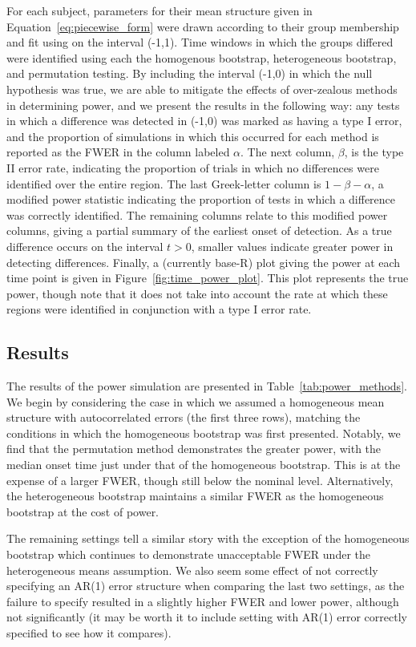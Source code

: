 For each subject, parameters for their mean structure given in Equation~\ref{eq:piecewise_form} were drawn according to their group membership and fit using  on the interval (-1,1). Time windows in which the groups differed were identified using each the homogenous bootstrap, heterogeneous bootstrap, and permutation testing. By including the interval (-1,0) in which the null hypothesis was true, we are able to mitigate the effects of over-zealous methods in determining power, and we present the results in the following way: any tests in which a difference was detected in (-1,0) was marked as having a type I error, and the proportion of simulations in which this occurred for each method is reported as the FWER in the column labeled $\alpha$. The next column, $\beta$, is the type II error rate, indicating the proportion of trials in which no differences were identified over the entire region. The last Greek-letter column is $1 - \beta - \alpha$, a modified power statistic indicating the proportion of tests in which a difference was correctly identified. The remaining columns relate to this modified power columns, giving a partial summary of the earliest onset of detection. As a true difference occurs on the interval $t > 0$, smaller values indicate greater power in detecting differences. Finally, a (currently base-R) plot giving the power at each time point is given in Figure~\ref{fig:time_power_plot}. This plot represents the true power, though note that it does not take into account the rate at which these regions were identified in conjunction with a type I error rate.



\subsection{Results}

The results of the power simulation are presented in Table~\ref{tab:power_methods}. We begin by considering the case in which we assumed a homogeneous mean structure with autocorrelated errors (the first three rows), matching the conditions in which the homogeneous bootstrap was first presented. Notably, we find that the permutation method demonstrates the greater power, with the median onset time just under that of the homogeneous bootstrap. This is at the expense of a larger FWER, though still below the nominal level. Alternatively, the heterogeneous bootstrap maintains a similar FWER as the homogeneous bootstrap at the cost of power.

The remaining settings tell a similar story with the exception of the homogeneous bootstrap which continues to demonstrate unacceptable FWER under the heterogeneous means assumption. We also seem some effect of not correctly specifying an AR(1) error structure when comparing the last two settings, as the failure to specify resulted in a slightly higher FWER and lower power, although not significantly (it may be worth it to include setting with AR(1) error correctly specified to see how it compares). 


